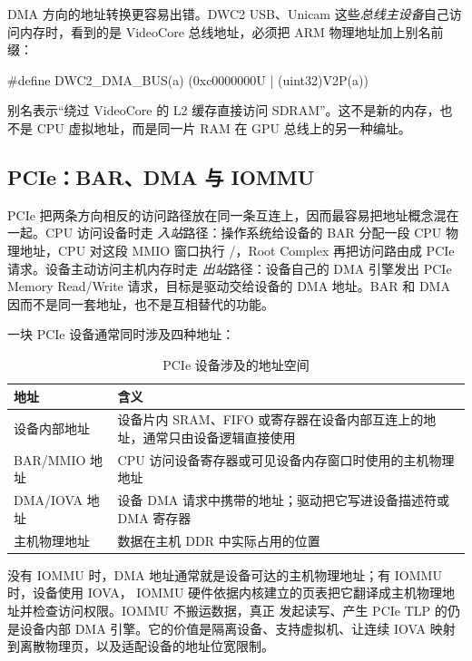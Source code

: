 DMA 方向的地址转换更容易出错。DWC2 USB、Unicam 这些\emph{总线主设备}自己访问内存时，看到的是 VideoCore 总线地址，必须把 ARM 物理地址加上别名前缀：

\begin{ccode}
#define DWC2_DMA_BUS(a) (0xc0000000U | (uint32)V2P(a))
\end{ccode}

 别名表示“绕过 VideoCore 的 L2 缓存直接访问 SDRAM”。这不是新的内存，也不是 CPU 虚拟地址，而是同一片 RAM 在 GPU 总线上的另一种编址。

\subsection{PCIe：BAR、DMA 与 IOMMU}

PCIe 把两条方向相反的访问路径放在同一条互连上，因而最容易把地址概念混在一起。CPU 访问设备时走
\emph{入站}路径：操作系统给设备的 BAR 分配一段 CPU 物理地址，CPU 对这段 MMIO 窗口执行
/，Root Complex 再把访问路由成 PCIe 请求。设备主动访问主机内存时走
\emph{出站}路径：设备自己的 DMA 引擎发出 PCIe Memory Read/Write 请求，目标是驱动交给设备的
DMA 地址。BAR 和 DMA 因而不是同一套地址，也不是互相替代的功能。

一块 PCIe 设备通常同时涉及四种地址：

\begin{table}[htbp]
  \centering
  \caption{PCIe 设备涉及的地址空间}
  \label{tab:pcie-addresses}
  \small
  \begin{tabularx}{\linewidth}{@{}lX@{}}
    \toprule
    地址 & 含义 \\
    \midrule
    设备内部地址 & 设备片内 SRAM、FIFO 或寄存器在设备内部互连上的地址，通常只由设备逻辑直接使用 \\
    BAR/MMIO 地址 & CPU 访问设备寄存器或可见设备内存窗口时使用的主机物理地址 \\
    DMA/IOVA 地址 & 设备 DMA 请求中携带的地址；驱动把它写进设备描述符或 DMA 寄存器 \\
    主机物理地址 & 数据在主机 DDR 中实际占用的位置 \\
    \bottomrule
  \end{tabularx}
\end{table}

没有 IOMMU 时，DMA 地址通常就是设备可达的主机物理地址；有 IOMMU 时，设备使用 IOVA，
IOMMU 硬件依据内核建立的页表把它翻译成主机物理地址并检查访问权限。IOMMU 不搬运数据，真正
发起读写、产生 PCIe TLP 的仍是设备内部 DMA 引擎。它的价值是隔离设备、支持虚拟机、让连续
IOVA 映射到离散物理页，以及适配设备的地址位宽限制。

